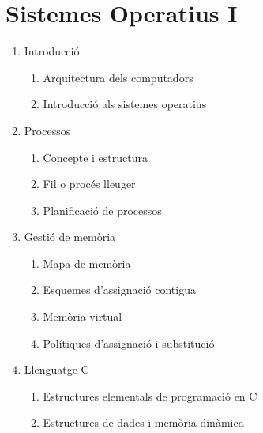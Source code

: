 \documentclass{article}
\begin{document}
\section{Sistemes Operatius I}
\begin{enumerate}
\item Introducció
	\begin{enumerate}
	\item Arquitectura dels computadors
	\item Introducció als sistemes operatius
	\end{enumerate}
\item Processos
	\begin{enumerate}
	\item Concepte i estructura
	\item Fil o procés lleuger
	\item Planificació de processos
	\end{enumerate}
\item Gestió de memòria
	\begin{enumerate}
	\item Mapa de memòria
	\item Esquemes d’assignació contigua
	\item Memòria virtual
	\item Polítiques d’assignació i substitució
	\end{enumerate}
\item Llenguatge C
	\begin{enumerate}
	\item Estructures elementals de programació en C
	\item Estructures de dades i memòria dinàmica
	\end{enumerate}
\end{enumerate}
\end{document}
